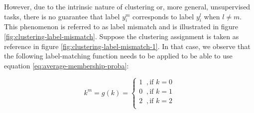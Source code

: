 However, due to the intrinsic nature of clustering or, more general, unsupervised tasks, there is no guarantee that label $y^m_i$ corresponds to label $y^l_i$ when $l \not = m$. This phenomenon is referred to as label mismatch and is illustrated in figure \ref{fig:clustering-label-mismatch}. Suppose the clustering assignment is taken as reference in figure \ref{fig:clustering-label-mismatch-1}. In that case, we observe that the following label-matching function needs to be applied to be able to use equation \ref{eq:average-membership-proba}:

\begin{equation}
    k^m = g(k) = \begin{cases}
  1  \;\;, \text{if } k = 0\\
  0  \;\;, \text{if } k = 1\\
  2  \;\;, \text{if } k = 2\\
\end{cases}
\end{equation}

